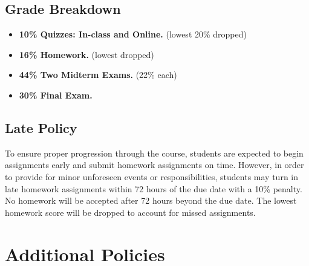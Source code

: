 \documentclass[9pt]{article}
\begin{document}
\subsection*{Grade Breakdown}

\begin{itemize}[noitemsep]
    \item \textbf{10\% Quizzes: In-class and Online.} (lowest 20\% dropped)
    \item \textbf{16\% Homework.} (lowest dropped)
    \item \textbf{44\% Two Midterm Exams.} (22\% each)
    \item \textbf{30\% Final Exam.}
\end{itemize}

\subsection*{Late Policy}

To ensure proper progression through the course, students are expected to begin assignments early and submit homework assignments on time. However, in order to provide for minor unforeseen events or responsibilities, students may turn in late homework assignments within 72 hours of the due date with a 10\% penalty. No homework will be accepted after 72 hours beyond the due date. The lowest homework score will be dropped to account for missed assignments.

\section*{Additional Policies}

{\small
    
}
\end{document}
